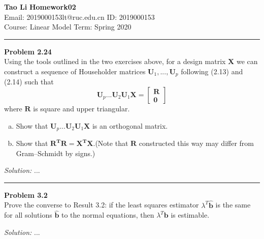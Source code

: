 \documentclass[a4paper, 11pt]{article}
\newenvironment{problem}[2][Problem]
    { \begin{mdframed}[backgroundcolor=gray!20] \textbf{#1 #2} \\}
    {  \end{mdframed}}
\newenvironment{solution}
    {\textit{Solution:}}
    {}
\begin{document}
\noindent
\large\textbf{Tao Li} \hfill \textbf{Homework02}   \\
Email: 2019000153lt@ruc.edu.cn \hfill ID: 2019000153 \\
\normalsize Course: Linear Model   \hfill Term: Spring 2020\\
\noindent\rule{7in}{2.8pt}
\begin{problem}{2.24}
  Using the tools outlined in the two exercises above, for a design matrix $\mathbf{X}$ we can construct a sequence of Householder 
  matrices $\mathbf{U}_1,...,\mathbf{U}_p$ following (2.13) and (2.14) such that 
  $$\mathbf{U}_p...\mathbf{U}_2\mathbf{U}_1\mathbf{X}=\left[\begin{array}{c}{\mathbf{R}} \\{\mathbf{0}}\end{array}\right]$$
  where $\mathbf{R}$ is square and upper triangular.
  \begin{enumerate}[a.]
    \item Show that $\mathbf{U}_p...\mathbf{U}_2\mathbf{U}_1\mathbf{X}$ is an orthogonal matrix.
    \item Show that $\mathbf{R^TR = X^TX}$.(Note that $\mathbf{R}$ constructed this way may differ from Gram–Schmidt by signs.)
  \end{enumerate}
\end{problem}
\begin{solution}
...
\end{solution}

\noindent\rule{7in}{2.8pt}
\begin{problem}{3.2}
  Prove the converse to Result 3.2: if the least squares estimator $\lambda^T \mathbf{\hat{b}}$ is the same for 
  all solutions $\mathbf{\hat{b}}$ to the normal equations, then $\lambda^T \mathbf{b}$ is estimable.
\end{problem}
\begin{solution}
...
\end{solution}
\end{document}
